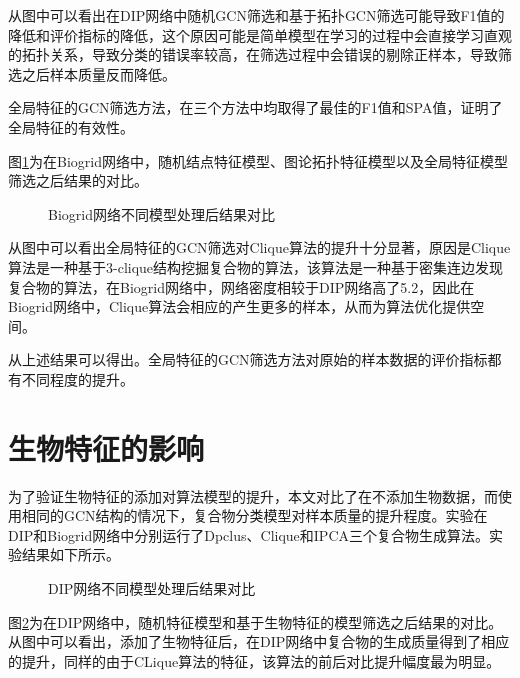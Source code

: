 从图中可以看出在DIP网络中随机GCN筛选和基于拓扑GCN筛选可能导致F1值的降低和评价指标的降低，这个原因可能是简单模型在学习的过程中会直接学习直观的拓扑关系，导致分类的错误率较高，在筛选过程中会错误的剔除正样本，导致筛选之后样本质量反而降低。

全局特征的GCN筛选方法，在三个方法中均取得了最佳的F1值和SPA值，证明了全局特征的有效性。

图\ref{fig:result/Biogrid/node}为在Biogrid网络中，随机结点特征模型、图论拓扑特征模型以及全局特征模型筛选之后结果的对比。
\begin{figure}[htbp]
    \centering
    \vskip0.2cm
    \caption{Biogrid网络不同模型处理后结果对比}
    \label{fig:result/Biogrid/node}
\end{figure}

从图中可以看出全局特征的GCN筛选对Clique算法的提升十分显著，原因是Clique算法是一种基于3-clique结构挖掘复合物的算法，该算法是一种基于密集连边发现复合物的算法，在Biogrid网络中，网络密度相较于DIP网络高了5.2，因此在Biogrid网络中，Clique算法会相应的产生更多的样本，从而为算法优化提供空间。

从上述结果可以得出。全局特征的GCN筛选方法对原始的样本数据的评价指标都有不同程度的提升。

\section{生物特征的影响}
\label{section:biofeatAnasys}
为了验证生物特征的添加对算法模型的提升，本文对比了在不添加生物数据，而使用相同的GCN结构的情况下，复合物分类模型对样本质量的提升程度。实验在DIP和Biogrid网络中分别运行了Dpclus、Clique和IPCA三个复合物生成算法。实验结果如下所示。
\begin{figure}[htbp]
    \centering
    \vskip0.2cm
    \caption{DIP网络不同模型处理后结果对比}
    \label{fig:result/DIP/edge}
\end{figure}

图\ref{fig:result/DIP/edge}为在DIP网络中，随机特征模型和基于生物特征的模型筛选之后结果的对比。
从图中可以看出，添加了生物特征后，在DIP网络中复合物的生成质量得到了相应的提升，同样的由于CLique算法的特征，该算法的前后对比提升幅度最为明显。

